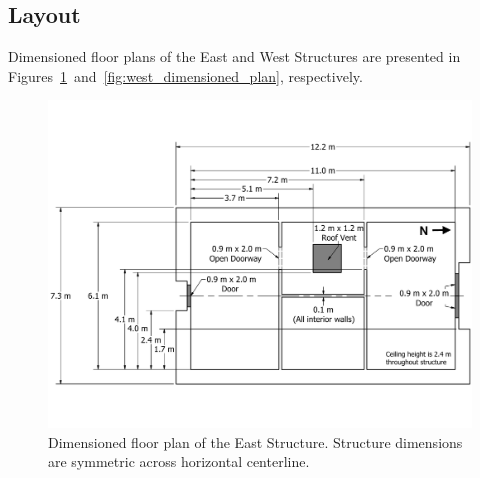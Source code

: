 \subsection{Layout}

Dimensioned floor plans of the East and West Structures are presented in Figures~\ref{fig:east_dimensioned_plan}~and~\ref{fig:west_dimensioned_plan}, respectively.

\begin{figure}[!h]
	\centering
	\includegraphics[width=\columnwidth]{Figures/Floor_Plans/East_Structure_Dimensioned_Full}
	\caption[Dimensioned floor plan of the East Structure]{Dimensioned floor plan of the East Structure. Structure dimensions are symmetric across horizontal centerline.}
	\label{fig:east_dimensioned_plan}
\end{figure}

